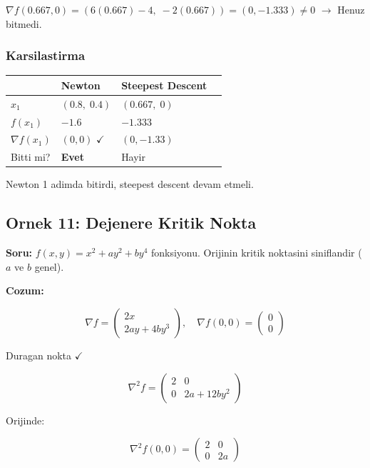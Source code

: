 \documentclass[12pt,a4paper]{article}
\theoremstyle{definition}
\theoremstyle{remark}
\begin{document}
$\nabla f(0.667, 0) = (6(0.667) - 4,\; -2(0.667)) = (0, -1.333) \neq 0$ $\rightarrow$ Henuz bitmedi.

\subsubsection{Karsilastirma}

\begin{center}
\begin{tabular}{@{}llll@{}}
\toprule
 & \textbf{Newton} & \textbf{Steepest Descent} \\
\midrule
$x_1$ & $(0.8,\; 0.4)$ & $(0.667,\; 0)$ \\
$f(x_1)$ & $-1.6$ & $-1.333$ \\
$\nabla f(x_1)$ & $(0, 0)$ $\checkmark$ & $(0, -1.33)$ \\
Bitti mi? & \textbf{Evet} & Hayir \\
\bottomrule
\end{tabular}
\end{center}

Newton 1 adimda bitirdi, steepest descent devam etmeli.

\subsection{Ornek 11: Dejenere Kritik Nokta}

\textbf{Soru:} $f(x,y) = x^2 + ay^2 + by^4$ fonksiyonu. Orijinin kritik noktasini siniflandir ($a$ ve $b$ genel).

\bigskip
\textbf{Cozum:}

\[
\nabla f = \begin{pmatrix} 2x \\ 2ay + 4by^3 \end{pmatrix}, \quad \nabla f(0,0) = \begin{pmatrix} 0 \\ 0 \end{pmatrix}
\]

Duragan nokta $\checkmark$

\[
\nabla^2 f = \begin{pmatrix} 2 & 0 \\ 0 & 2a + 12by^2 \end{pmatrix}
\]

Orijinde:

\[
\nabla^2 f(0,0) = \begin{pmatrix} 2 & 0 \\ 0 & 2a \end{pmatrix}
\]
\end{document}
